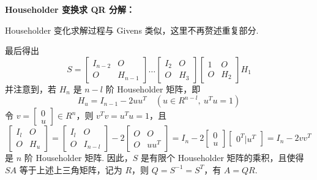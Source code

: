             \par \textbf{Householder 变换求 QR 分解：}
            \par Householder 变化求解过程与 Givens 类似，这里不再赘述重复部分.
            \par 最后得出 
            \begin{equation*}
                S = \begin{bmatrix}
                    I_{n-2} & O \\ O & H_{n-1} 
                \end{bmatrix} \dots \begin{bmatrix}
                    I_2 & O \\ O & H_3
                \end{bmatrix} \begin{bmatrix}
                    1 & O \\ O & H_2
                \end{bmatrix} H_1
            \end{equation*}
            并注意到，若 $H_n$ 是 $n-l$ 阶 Householder 矩阵，即
            \begin{equation*}
                H_u = I_{n-1} - 2uu^T \quad (u \in R^{n-l}, \ u^Tu = 1)
            \end{equation*}
            令 $v = \begin{bmatrix} 0 \\ u \end{bmatrix} \in R^n$，则 $v^Tv = u^Tu = 1$，且
            \begin{equation*}
                \begin{bmatrix}
                    I_l & O \\ O & H_u 
                \end{bmatrix} = \begin{bmatrix}
                    I_l & O \\ O & I_{n-l}
                \end{bmatrix} - 2\begin{bmatrix}
                    O & O \\ O & uu^T
                \end{bmatrix} = I_n - 2\begin{bmatrix}
                    0 \\ u
                \end{bmatrix}\begin{bmatrix}
                    0^T | u^T
                \end{bmatrix} = I_n - 2vv^T
            \end{equation*}
            是 $n$ 阶 Householder 矩阵. 因此，$S$ 是有限个 Householder 矩阵的乘积，且使得 $SA$ 等于上述上三角矩阵，记为 $R$，则 $Q = S^{-1} = S^T$，有 $A = QR$.
 
